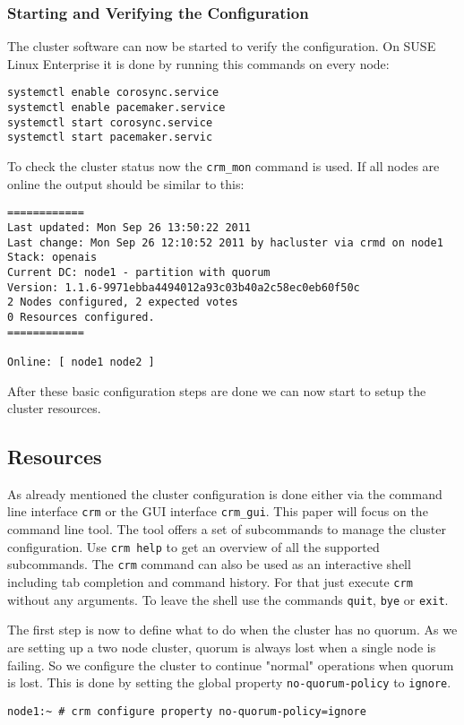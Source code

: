 \documentclass[a4paper,11pt,DIV=12]{scrartcl}
\begin{document}
\subsubsection{Starting and Verifying the Configuration}
    The cluster software can now be started to verify the configuration. On
    SUSE Linux Enterprise it is done by running this commands on every node:
    \begin{verbatim}
systemctl enable corosync.service
systemctl enable pacemaker.service
systemctl start corosync.service
systemctl start pacemaker.servic
    \end{verbatim}
    To check the cluster status now the \verb|crm_mon| command is used.
    If all nodes are online the output should be similar to this:
    \begin{verbatim}
============
Last updated: Mon Sep 26 13:50:22 2011
Last change: Mon Sep 26 12:10:52 2011 by hacluster via crmd on node1
Stack: openais
Current DC: node1 - partition with quorum
Version: 1.1.6-9971ebba4494012a93c03b40a2c58ec0eb60f50c
2 Nodes configured, 2 expected votes
0 Resources configured.
============

Online: [ node1 node2 ]
    \end{verbatim}

    After these basic configuration steps are done we can now start to setup
    the cluster resources.

\subsection{Resources}
    As already mentioned the cluster configuration is done either via the
    command line interface \verb|crm| or the GUI interface \verb|crm_gui|. This
    paper will focus on the command line tool. The tool offers a set of
    subcommands to manage the cluster configuration. Use \verb|crm help| to get
    an overview of all the supported subcommands. The \verb|crm| command can
    also be used as an interactive shell including tab completion and command
    history.  For that just execute \verb|crm| without any arguments. To leave
    the shell use the commands \verb|quit|, \verb|bye| or \verb|exit|.

    The first step is now to define what to do when the
    cluster has no quorum. As we are setting up a two node cluster, quorum is
    always lost when a single node is failing. So we configure the cluster to
    continue "normal" operations when quorum is lost.  This is done by setting
    the global property \verb|no-quorum-policy| to \verb|ignore|.
    \begin{verbatim}
node1:~ # crm configure property no-quorum-policy=ignore
    \end{verbatim}
\end{document}
